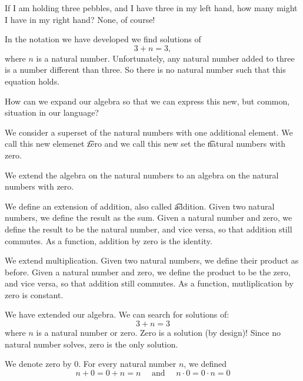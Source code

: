 
\sbasic













\sstart
{}


If I am holding
three pebbles, and I have three
in my left hand, how many
might I have in my right hand?
None, of course!

In the notation we have developed
we find solutions of
\[
  3 + n = 3,
\]
where $n$ is a natural number.
Unfortunately, any natural number
added to three is a number different
than three.
So there is no natural number
such that this equation holds.

How can we expand our algebra
so that we can express this
new, but common, situation in
our language?


We consider a superset
of the natural numbers with
one additional element.
We call this new elemenet
\t{zero}
and we call this new set
the
\t{natural numbers with zero}.


We extend the algebra on
the natural numbers to an
algebra on the natural numbers
with zero.

We define an extension of addition,
also called
\t{addition}.
Given two natural
numbers, we define the
result as the sum.
Given a natural number
and zero,
we define the result
to be the natural number,
and vice versa,
so that addition
still commutes.
As a function, addition
by zero is the identity.

We extend multiplication.
Given two natural
numbers, we define their
product as before.
Given a natural number
and zero,
we define the product
to be the zero,
and vice versa,
so that addition
still commutes.
As a function, mutliplication
by zero is constant.


We have extended our algebra.
We can search for solutions of:
\[
  3 + n = 3
\]
where $n$ is a natural
number or zero.
Zero is a solution (by design)!
Since no natural number
solves, zero is
the only solution.


We denote zero by $0$.
For every natural number
$n$, we defined
\[
  n + 0 = 0 + n = n \quad \text{ and } \quad n \cdot 0 = 0 \cdot n = 0
\]
\strats
